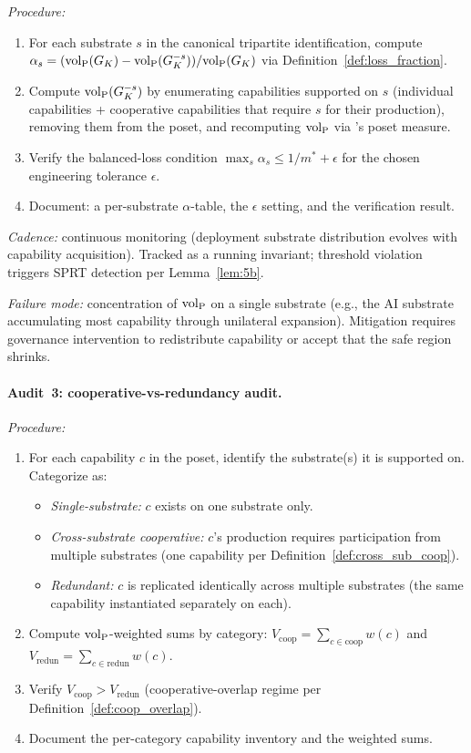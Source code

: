 \emph{Procedure:}
\begin{enumerate}
\item For each substrate $s$ in the canonical tripartite
  identification, compute $\alpha_s = ({\operatorname{vol}_{\mathrm{P}}}(G_K) - {\operatorname{vol}_{\mathrm{P}}}(G_K^{-s})) /
  {\operatorname{vol}_{\mathrm{P}}}(G_K)$ via Definition~\ref{def:loss_fraction}.
\item Compute ${\operatorname{vol}_{\mathrm{P}}}(G_K^{-s})$ by enumerating capabilities supported
  on $s$ (individual capabilities + cooperative capabilities that
  require $s$ for their production), removing them from the poset,
  and recomputing ${\operatorname{vol}_{\mathrm{P}}}$ via \citep{lasser2026poset}'s poset measure.
\item Verify the balanced-loss condition $\max_s \alpha_s \leq
  1/m^* + \epsilon$ for the chosen engineering tolerance
  $\epsilon$.
\item Document: a per-substrate $\alpha$-table, the $\epsilon$
  setting, and the verification result.
\end{enumerate}

\emph{Cadence:} continuous monitoring (deployment substrate
distribution evolves with capability acquisition). Tracked as a
running invariant; threshold violation triggers SPRT detection per
Lemma~\ref{lem:5b}.

\emph{Failure mode:} concentration of ${\operatorname{vol}_{\mathrm{P}}}$ on a single substrate
(e.g., the AI substrate accumulating most capability through
unilateral expansion). Mitigation requires governance intervention
to redistribute capability or accept that the safe region shrinks.

\paragraph{Audit~3: cooperative-vs-redundancy audit.}

\emph{Procedure:}
\begin{enumerate}
\item For each capability $c$ in the poset, identify the
  substrate(s) it is supported on. Categorize as:
  \begin{itemize}
  \item \emph{Single-substrate:} $c$ exists on one substrate only.
  \item \emph{Cross-substrate cooperative:} $c$'s production
    requires participation from multiple substrates (one capability
    per Definition~\ref{def:cross_sub_coop}).
  \item \emph{Redundant:} $c$ is replicated identically across
    multiple substrates (the same capability instantiated separately
    on each).
  \end{itemize}
\item Compute ${\operatorname{vol}_{\mathrm{P}}}$-weighted sums by category:
  $V_{\mathrm{coop}} = \sum_{c \in \mathrm{coop}} w(c)$ and
  $V_{\mathrm{redun}} = \sum_{c \in \mathrm{redun}} w(c)$.
\item Verify $V_{\mathrm{coop}} > V_{\mathrm{redun}}$ (cooperative-overlap
    regime per Definition~\ref{def:coop_overlap}).
\item Document the per-category capability inventory and the
  weighted sums.
\end{enumerate}

